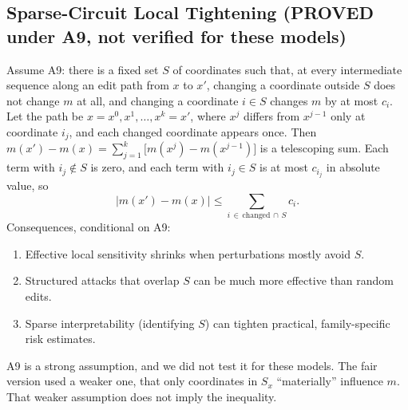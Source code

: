 \documentclass[11pt]{article}
\newcommand{\lab}[1]{{\footnotesize\MakeUppercase{#1}}}
\newcommand{\proved}{\lab{proved}}
\begin{document}
\subsection{Sparse-Circuit Local Tightening (\proved{} under A9, not verified for these models)}
Assume A9: there is a fixed set $S$ of coordinates such that, at every intermediate sequence along an edit path from $x$ to $x'$, changing a coordinate outside $S$ does not change $m$ at all, and changing a coordinate $i \in S$ changes $m$ by at most $c_i$. Let the path be $x = x^{0}, x^{1}, \ldots, x^{k} = x'$, where $x^{j}$ differs from $x^{j-1}$ only at coordinate $i_j$, and each changed coordinate appears once. Then $m(x') - m(x) = \sum_{j=1}^{k} \big[m(x^{j}) - m(x^{j-1})\big]$ is a telescoping sum. Each term with $i_j \notin S$ is zero, and each term with $i_j \in S$ is at most $c_{i_j}$ in absolute value, so
\[
|m(x') - m(x)| \le \sum_{i \,\in\, \mathrm{changed} \,\cap\, S} c_i.
\]
Consequences, conditional on A9:
\begin{enumerate}
  \item Effective local sensitivity shrinks when perturbations mostly avoid $S$.
  \item Structured attacks that overlap $S$ can be much more effective than random edits.
  \item Sparse interpretability (identifying $S$) can tighten practical, family-specific risk estimates.
\end{enumerate}
A9 is a strong assumption, and we did not test it for these models. The fair version used a weaker one, that only coordinates in $S_x$ ``materially'' influence $m$. That weaker assumption does not imply the inequality.
\end{document}

